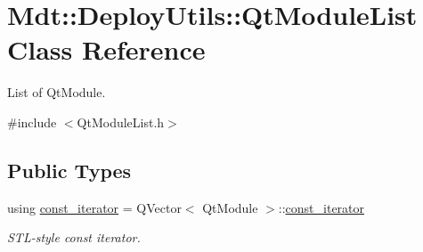 \hypertarget{class_mdt_1_1_deploy_utils_1_1_qt_module_list}{}\section{Mdt\+:\+:Deploy\+Utils\+:\+:Qt\+Module\+List Class Reference}
\label{class_mdt_1_1_deploy_utils_1_1_qt_module_list}


List of Qt\+Module.  




{\ttfamily \#include $<$Qt\+Module\+List.\+h$>$}

\subsection*{Public Types}
\begin{DoxyCompactItemize}
\item 
using \hyperlink{class_mdt_1_1_deploy_utils_1_1_qt_module_list_ad6f5d3797918d10ffcce59cf37fcd86f}{const\+\_\+iterator} = Q\+Vector$<$ Qt\+Module $>$\+::\hyperlink{class_mdt_1_1_deploy_utils_1_1_qt_module_list_ad6f5d3797918d10ffcce59cf37fcd86f}{const\+\_\+iterator}
\begin{DoxyCompactList}\small\item\em S\+T\+L-\/style const iterator. \end{DoxyCompactList}\end{DoxyCompactItemize}
